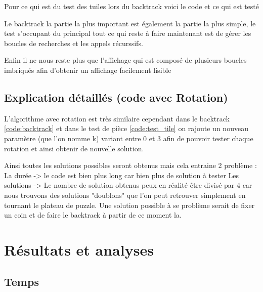 \documentclass[french]{rapport}
\begin{document}
Pour ce qui est du test des tuiles lors du backtrack voici le code et ce qui est testé
 

Le backtrack la partie la plus important est également la partie la plus simple, le test s'occupant du principal tout ce qui reste à faire maintenant est de gérer les boucles de recherches et les appels récurssifs. 
 

Enfin il ne nous reste plus que l'affichage qui est composé de plusieurs boucles imbriqués afin d'obtenir un affichage facilement lisible 
 

\subsection*{Explication détaillés (code avec Rotation)}

L'algorithme avec rotation est très similaire cependant dans le backtrack \ref{code:backtrack} et dans le test de pièce \ref{code:test_tile} on rajoute un nouveau paramètre (que l'on nomme k) variant entre 0 et 3 afin de pouvoir tester chaque rotation et ainsi obtenir de nouvelle solution.



Ainsi toutes les solutions possibles seront obtenus mais cela entraine 2 problème :
La durée -> le code est bien plus long car bien plus de solution à tester
Les solutions -> Le nombre de solution obtenus peux en réalité être divisé par 4 car nous trouvons des solutions "doublons" que l'on peut retrouver simplement en tournant le plateau de puzzle. Une solution possible à se problème serait de fixer un coin et de faire le backtrack à partir de ce moment la.

\section{Résultats et analyses}

\subsection{Temps}
\end{document}
